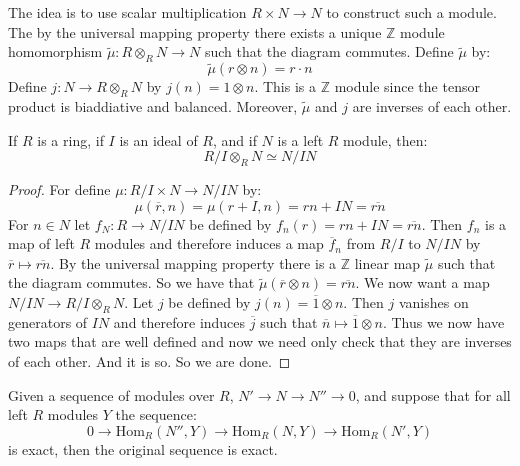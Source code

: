 \documentclass{article}                                                        %
\begin{document}
        The idea is to use scalar multiplication $R\times{N}\rightarrow{N}$ to
        construct such a module. The by the universal mapping property there
        exists a unique $\mathbb{Z}$ module homomorphism
        $\tilde{\mu}:R\otimes_{R}N\rightarrow{N}$ such that the diagram
        commutes. Define $\tilde{\mu}$ by:
        \begin{equation}
            \tilde{\mu}(r\otimes{n})=r\cdot{n}
        \end{equation}
        Define $j:N\rightarrow{R}\otimes_{R}N$ by $j(n)=1\otimes{n}$.
        This is a $\mathbb{Z}$ module since the tensor product is biaddiative
        and balanced. Moreover, $\tilde{\mu}$ and $j$ are inverses of each
        other.
        \begin{theorem}
            If $R$ is a ring, if $I$ is an ideal of $R$, and if $N$ is a left
            $R$ module, then:
            \begin{equation}
                R/I\otimes_{R}N\simeq{N}/IN
            \end{equation}
        \end{theorem}
        \begin{proof}
            For define $\mu:R/I\times{N}\rightarrow{N}/IN$ by:
            \begin{equation}
                \mu(\overline{r},n)=\mu(r+I,n)=rn+IN=\overline{rn}
            \end{equation}
            For $n\in{N}$ let $f_{N}:R\rightarrow{N}/IN$ be defined by
            $f_{n}(r)=rn+IN=\overline{rn}$. Then $f_{n}$ is a map of left
            $R$ modules and therefore induces a map $\overline{f}_{n}$ from
            $R/I$ to $N/IN$ by $\overline{r}\mapsto\overline{rn}$. By the
            universal mapping property there is a $\mathbb{Z}$ linear map
            $\tilde{\mu}$ such that the diagram commutes. So we have that
            $\tilde{\mu}(\overline{r}\otimes{n})=\overline{rn}$. We now want a
            map $N/IN\rightarrow{R}/I\otimes_{R}N$. Let $j$ be defined by
            $j(n)=\overline{1}\otimes{n}$. Then $j$ vanishes on generators of
            $IN$ and therefore induces $\overline{j}$ such that
            $\overline{n}\mapsto\overline{1}\otimes{n}$. Thus we now have two
            maps that are well defined and now we need only check that they are
            inverses of each other. And it is so. So we are done.
        \end{proof}
        \begin{theorem}
            Given a sequence of modules over $R$,
            $N'\rightarrow{N}\rightarrow{N}''\rightarrow{0}$,
            and suppose that for all left $R$ modules $Y$ the
            sequence:
            \begin{equation}
                0\rightarrow\textrm{Hom}_{R}(N'',Y)
                \rightarrow\textrm{Hom}_{R}(N,Y)
                \rightarrow\textrm{Hom}_{R}(N',Y)
            \end{equation}
            is exact, then the original sequence is exact.
        \end{theorem}
\end{document}
